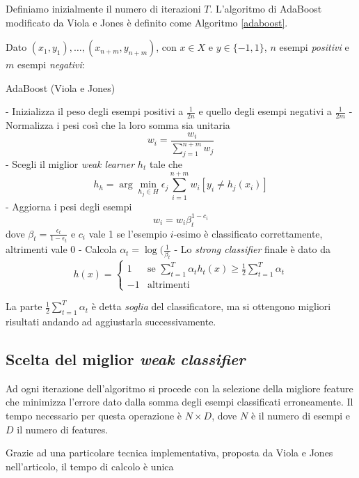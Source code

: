 Definiamo inizialmente il numero di iterazioni $T$. L'algoritmo di AdaBoost modificato da Viola e Jones è definito come Algoritmo \ref{adaboost}.

Dato $(x_1, y_1), \ldots, (x_{n+m}, y_{n+m})$, con $x \in X$ e $y \in \{-1, 1\}$, $n$ esempi \emph{positivi} e $m$ esempi \emph{negativi}:

\begin{algorithm}
\caption{AdaBoost (Viola e Jones)}\label{adaboost}
\begin{algorithmic}
\State - Inizializza il peso degli esempi positivi a $\frac{1}{2n}$ e quello degli esempi negativi a $\frac{1}{2m}$
\State - Normalizza i pesi così che la loro somma sia unitaria $$w_{i} = \frac{w_{i}}{\sum_{j = 1}^{n+m} w_{j}}$$
\State - Scegli il miglior \emph{weak learner} $h_t$ tale che
$$h_h = \arg \min_{h_j \in H} \epsilon_j \sum_{i = 1}^{n+m} w_{i} [y_i \neq h_j(x_i)]$$
\State - Aggiorna i pesi degli esempi
$$w_i = w_i \beta_{t}^{1 - c_i}$$
dove $\beta_t = \frac{\epsilon_t}{1 - \epsilon_t}$ e $c_i$ vale 1 se l'esempio $i$-esimo è classificato correttamente, altrimenti vale 0
\State - Calcola $\alpha_t = \log (\frac{1}{\beta_t}$
\EndFor
\State - Lo \emph{strong classifier} finale è dato da
$$h(x) = \left\{
\begin{array}{ll}
1 & \mbox{se } \sum_{t = 1}^{T} \alpha_t h_t(x) \geq \frac{1}{2} \sum_{t = 1}^{T} \alpha_t \\
-1 & \mbox{altrimenti}
\end{array}
\right.$$
\end{algorithmic}
\end{algorithm}
La parte $\frac{1}{2} \sum_{t = 1}^{T} \alpha_t$ è detta \emph{soglia} del classificatore, ma si ottengono migliori risultati andando ad aggiustarla successivamente.

\subsection{Scelta del miglior \emph{weak classifier}}

Ad ogni iterazione dell'algoritmo si procede con la selezione della migliore feature che minimizza l'errore dato dalla somma degli esempi classificati erroneamente. Il tempo necessario per questa operazione è $N \times D$, dove $N$ è il numero di esempi e $D$ il numero di features.

Grazie ad una particolare tecnica implementativa, proposta da Viola e Jones nell'articolo, il tempo di calcolo è unica

